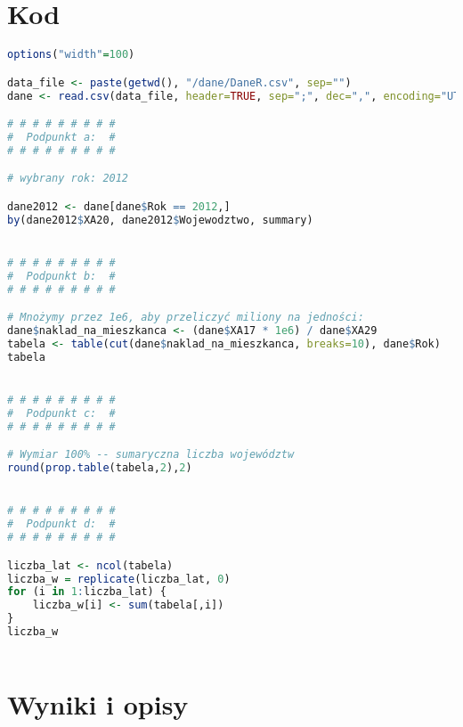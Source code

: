 \newpage

\section*{Kod}

\begin{lstlisting}[language=R]
options("width"=100)

data_file <- paste(getwd(), "/dane/DaneR.csv", sep="")
dane <- read.csv(data_file, header=TRUE, sep=";", dec=",", encoding="UTF-8")

# # # # # # # # #
#  Podpunkt a:  #
# # # # # # # # #

# wybrany rok: 2012

dane2012 <- dane[dane$Rok == 2012,]
by(dane2012$XA20, dane2012$Wojewodztwo, summary)


# # # # # # # # #
#  Podpunkt b:  #
# # # # # # # # #

# Mnożymy przez 1e6, aby przeliczyć miliony na jedności:
dane$naklad_na_mieszkanca <- (dane$XA17 * 1e6) / dane$XA29
tabela <- table(cut(dane$naklad_na_mieszkanca, breaks=10), dane$Rok)
tabela


# # # # # # # # #
#  Podpunkt c:  #
# # # # # # # # #

# Wymiar 100% -- sumaryczna liczba województw
round(prop.table(tabela,2),2) 


# # # # # # # # #
#  Podpunkt d:  #
# # # # # # # # #

liczba_lat <- ncol(tabela)
liczba_w = replicate(liczba_lat, 0)
for (i in 1:liczba_lat) {
    liczba_w[i] <- sum(tabela[,i])
}
liczba_w
    
\end{lstlisting}

\section*{Wyniki i opisy}



